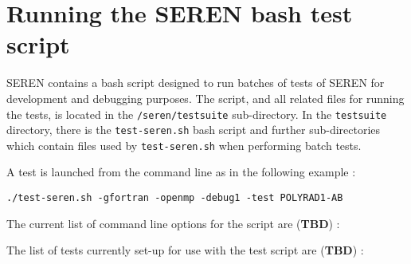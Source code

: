 \documentclass[a4paper]{article}
\newcommand{\var}[1]{\texttt{#1}}
\begin{document}
\newpage
\section{Running the SEREN bash test script}
SEREN contains a bash script designed to run batches of tests of SEREN for development and debugging purposes.  The script, and all related files for running the tests, is located in the \var{/seren/testsuite} sub-directory.  In the \var{testsuite} directory, there is the \var{test-seren.sh} bash script and further sub-directories which contain files used by \var{test-seren.sh} when performing batch tests. 

A test is launched from the command line as in the following example : \newline

\var{./test-seren.sh -gfortran -openmp -debug1 -test POLYRAD1-AB} \newline

The current list of command line options for the script are ({\bf TBD}) : 

The list of tests currently set-up for use with the test script are ({\bf TBD}) : 
\newline
\end{document}
